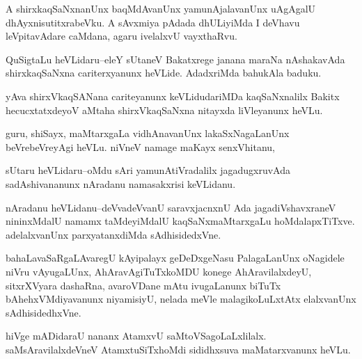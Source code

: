 \documentclass{article}
\begin{document}
\begin{mn}%
A shirxkaqSaNxnanUnx baqMdAvanUnx yamunAjalavanUnx uAgAgalU dhAyxnisutitxrabeVku. A 
sAvxmiya pAdada dhULiyiMda I deVhavu leVpitavAdare caMdana, agaru ivelalxvU vayxthaRvu.
\end{mn}


\begin{mn}%
QuSigtaLu heVLidaru--eleY sUtaneV Bakatxrege janana maraNa nAshakavAda shirxkaqSaNxna 
cariterxyanunx heVLide. AdadxriMda bahukAla baduku.
\end{mn}

\begin{mn}%
yAva shirxVkaqSANana cariteyanunx keVLidudariMDa kaqSaNxnalilx Bakitx hecucxtatxdeyoV 
aMtaha shirxVkaqSaNxna nitayxda liVleyanunx heVLu.
\end{mn}

\begin{mn}%
guru, shiSayx, maMtarxgaLa vidhAnavanUnx lakaSxNagaLanUnx beVrebeVreyAgi heVLu. niVneV 
namage maKayx senxVhitanu,
\end{mn}

\begin{mn}%
sUtaru heVLidaru--oMdu sAri yamunAtiVradalilx jagadugxruvAda sadAshivananunx nAradanu 
namasakxrisi keVLidanu.
\end{mn}

\begin{mn}%
nAradanu heVLidanu--deVvadeVvanU saravxjacnxnU Ada jagadiVshavxraneV nininxMdalU namamx 
taMdeyiMdalU kaqSaNxmaMtarxgaLu hoMdalapxTiTxve. adelalxvanUnx parxyatanxdiMda 
sAdhisidedxVne.
\end{mn}

\begin{mn}%
bahaLavaSaRgaLAvaregU kAyipalayx geDeDxgeNasu PalagaLanUnx oNagidele niVru vAyugaLUnx, 
AhAravAgiTuTxkoMDU konege AhAravilalxdeyU, sitxrXVyara dashaRna, avaroVDane mAtu 
ivugaLanunx biTuTx bAhehxVMdiyavanunx niyamisiyU, nelada meVle malagikoLuLxtAtx 
elalxvanUnx sAdhisidedhxVne.
\end{mn}

\begin{mn}%
hiVge mADidaraU nananx AtamxvU saMtoVSagoLaLxlilalx. saMsAravilalxdeVneV AtamxtuSiTxhoMdi 
sididhxsuva maMatarxvanunx heVLu.
\end{mn}
\end{document}
